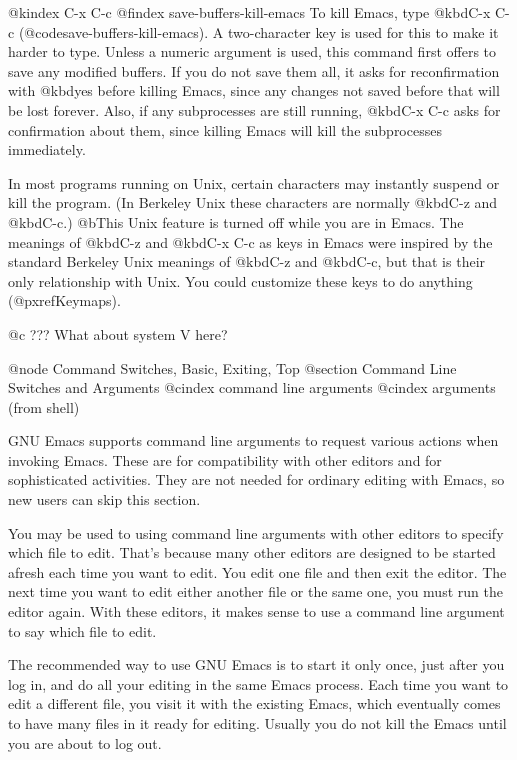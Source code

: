 {{{@kindex C-x C-c
@findex save-buffers-kill-emacs
  To kill Emacs, type @kbd{C-x C-c} (@code{save-buffers-kill-emacs}).  A
two-character key is used for this to make it harder to type.  Unless a
numeric argument is used, this command first offers to save any modified
buffers.  If you do not save them all, it asks for reconfirmation with
@kbd{yes} before killing Emacs, since any changes not saved before that will be
lost forever.  Also, if any subprocesses are still running, @kbd{C-x C-c}
asks for confirmation about them, since killing Emacs will kill the
subprocesses immediately.

  In most programs running on Unix, certain characters may instantly
suspend or kill the program.  (In Berkeley Unix these characters are
normally @kbd{C-z} and @kbd{C-c}.)  @b{This Unix feature is turned off
while you are in Emacs.}  The meanings of @kbd{C-z} and @kbd{C-x C-c} as
keys in Emacs were inspired by the standard Berkeley Unix meanings of
@kbd{C-z} and @kbd{C-c}, but that is their only relationship with
Unix.  You could customize these keys to do anything (@pxref{Keymaps}).

@c ??? What about system V here?

@node Command Switches, Basic, Exiting, Top
@section Command Line Switches and Arguments
@cindex command line arguments
@cindex arguments (from shell)


  GNU Emacs supports command line arguments to request various actions
when invoking Emacs.  These are for compatibility with other editors and
for sophisticated activities.  They are not needed for ordinary editing
with Emacs, so new users can skip this section.

  You may be used to using command line arguments with other editors
to specify which file to edit.  That's because many other editors are
designed to be started afresh each time you want to edit.  You
edit one file and then exit the editor.  The next time you want to edit
either another file or the same one, you must run the editor again.
With these editors, it makes sense to use a command line argument
to say which file to edit.

  The recommended way to use GNU Emacs is to start it only once, just after
you log in, and do all your editing in the same Emacs process.  Each time
you want to edit a different file, you visit it with the existing Emacs,
which eventually comes to have many files in it ready for editing.  Usually
you do not kill the Emacs until you are about to log out.

}}}
